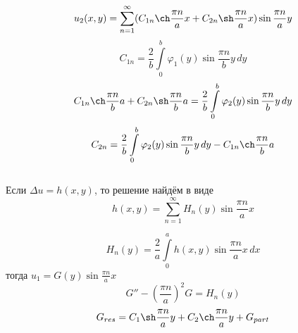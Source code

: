 \[
	u_2(x, y) = \sum_{n = 1}^{\infty} (C_{1n} \ch \frac{\pi n}{a} x + C_{2n} \sh \frac{\pi n}{a} x) \sin \frac{\pi n}{a} y
\]
\[
	C_{1n} = \frac{2}{b} \int\limits_{0}^{b} \varphi_1 (y) \sin \frac{\pi n}{b} y\, dy
\]
\[
	C_{1n} \ch \frac{\pi n}{b} a + C_{2n} \sh \frac{\pi n}{b} a = \frac{2}{b} \int\limits_{0}^{b} \varphi_2(y) \sin \frac{\pi n}{b} y\, dy
\]
\[
	C_{2n} = \frac{2}{b} \int\limits_{0}^{b} \varphi_2 (y) \sin \frac{\pi n}{b} y\, dy - C_{1n} \ch \frac{\pi n}{b} a 
\]
\\
Если $\Delta u = h(x, y)$, то решение найдём в виде
\[
	h(x, y) = \sum\limits_{n = 1}^{\infty} H_n (y) \sin \frac{\pi n}{a} x
\] 

\[
	H_n (y) = \frac{2}{a} \int\limits_0^a h(x, y) \sin \frac{\pi n}{a} x \, dx
\]
тогда $u_1 = G(y) \sin \frac{\pi n}{a} x$
\[
	G'' - \left(\frac{\pi n}{a} \right)^2 G = H_n (y)
\]
\[
	G_{res} = C_1 \sh \frac{\pi n}{a} y + C_2 \ch \frac{\pi n}{a} y + G_{part}
\]
